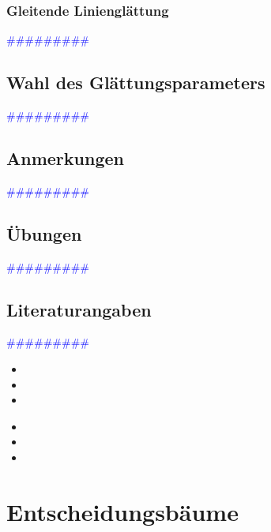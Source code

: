 \documentclass{article}
\begin{document}
    \subsubsection{Gleitende Linienglättung} %
       \textcolor{blue}{\#\#\#\#\#\#\#\#\#}
  \subsection{Wahl des Glättungsparameters} %
       \textcolor{blue}{\#\#\#\#\#\#\#\#\#}
  \subsection{Anmerkungen} %
       \textcolor{blue}{\#\#\#\#\#\#\#\#\#}
  \subsection{Übungen} %
       \textcolor{blue}{\#\#\#\#\#\#\#\#\#}
  \subsection{Literaturangaben} %
      \textcolor{blue}{\#\#\#\#\#\#\#\#\#}

      \begin{itemize}
      \color{red}
        \item
        \item
        \item
      \end{itemize}


      \begin{itemize}
      \color{ForestGreen}
        \item
        \item
        \item
      \end{itemize}




\newpage
\section{Entscheidungsbäume} %
\end{document}
